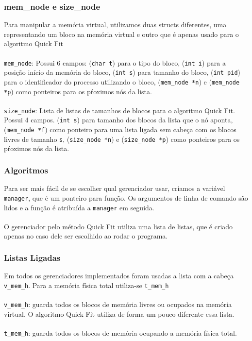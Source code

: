 \documentclass{beamer}
\begin{document}

\begin{frame}
  \frametitle{mem\_node e size\_node}
  Para manipular a memória virtual, utilizamos duas structs diferentes, uma representando um bloco na memória virtual e outro que é apenas usado para o algoritmo Quick Fit \\~\\

  \texttt{mem\_node}: Possui 6 campos: (\texttt{char t}) para o tipo do bloco, (\texttt{int i}) para a posição início da memória do bloco, (\texttt{int s}) para tamanho do bloco, (\texttt{int pid}) para o identificador do processo utilizando o bloco, (\texttt{mem\_node *n}) e (\texttt{mem\_node *p}) como ponteiros para os pŕoximos nós da lista. \\~\\

  \texttt{size\_node}: Lista de listas de tamanhos de blocos para o algoritmo Quick Fit. Possui 4 campos. (\texttt{int s}) para tamanho dos blocos da lista que o nó aponta, (\texttt{mem\_node *f}) como ponteiro para uma lista ligada sem cabeça com os blocos livres de tamanho \texttt{s}, (\texttt{size\_node *n}) e (\texttt{size\_node *p}) como ponteiros para os pŕoximos nós da lista.
\end{frame}


\begin{frame}
  \frametitle{Algoritmos}
  Para ser mais fácil de se escolher qual gerenciador usar, criamos a variável \texttt{manager}, que é um ponteiro para função. Os argumentos de linha de comando são lidos e a função é atribuída a \texttt{manager} em seguida. \\~\\

  O gerenciador pelo método Quick Fit utiliza uma lista de listas, que é criado apenas no caso dele ser escolhido ao rodar o programa.
\end{frame}


\begin{frame}
  \frametitle{Listas Ligadas}
  Em todos os gerenciadores implementados foram usadas a lista com a cabeça \texttt{v\_mem\_h}. Para a memória física total utiliza-se \texttt{t\_mem\_h} \\~\\

  \texttt{v\_mem\_h}: guarda todos os blocos de memória livres ou ocupados na memória virtual. O algoritmo Quick Fit utiliza de forma um pouco diferente essa lista. \\~\\

  \texttt{t\_mem\_h}: guarda todos os blocos de memória ocupando a memória física total.
\end{frame}
\end{document}
